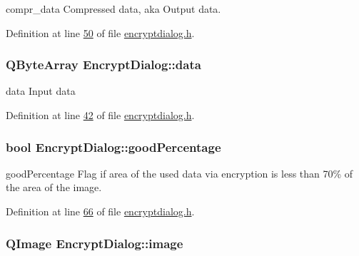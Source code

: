 compr\-\_\-data Compressed data, aka Output data. 



Definition at line \hyperlink{encryptdialog_8h_source_l00050}{50} of file \hyperlink{encryptdialog_8h_source}{encryptdialog.\-h}.

\hypertarget{class_encrypt_dialog_acf3a8bbce90d99ef17fec093c35b1008}{
\subsubsection[{data}]{\setlength{\rightskip}{0pt plus 5cm}Q\-Byte\-Array Encrypt\-Dialog\-::data}}\label{class_encrypt_dialog_acf3a8bbce90d99ef17fec093c35b1008}


data Input data 



Definition at line \hyperlink{encryptdialog_8h_source_l00042}{42} of file \hyperlink{encryptdialog_8h_source}{encryptdialog.\-h}.

\hypertarget{class_encrypt_dialog_a0c821b893cfddd7a6c07bbd270ba49e9}{
\subsubsection[{good\-Percentage}]{\setlength{\rightskip}{0pt plus 5cm}bool Encrypt\-Dialog\-::good\-Percentage}}\label{class_encrypt_dialog_a0c821b893cfddd7a6c07bbd270ba49e9}


good\-Percentage Flag if area of the used data via encryption is less than 70\% of the area of the image. 



Definition at line \hyperlink{encryptdialog_8h_source_l00066}{66} of file \hyperlink{encryptdialog_8h_source}{encryptdialog.\-h}.

\hypertarget{class_encrypt_dialog_a739a0df1d28d06b28a3fd16e2bc16c73}{
\subsubsection[{image}]{\setlength{\rightskip}{0pt plus 5cm}Q\-Image Encrypt\-Dialog\-::image}}\label{class_encrypt_dialog_a739a0df1d28d06b28a3fd16e2bc16c73}


